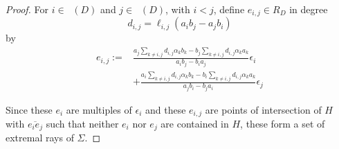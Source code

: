 \documentclass{amsart}
\theoremstyle{plain}
\theoremstyle{definition}
\theoremstyle{remark}
\newtheorem{rem}[thm]{Remark}
\numberwithin{equation}{section}
\newcommand\bida{a}
\newcommand\bidb{b}
\DeclareMathOperator{\Tp}{T_+}
\DeclareMathOperator{\Tm}{T_-}
\begin{document}
\begin{proof}
\noindent
For $i \in \Tp(D)$ and $j \in \Tm(D)$, with $i < j$, define $e_{i,j}\in R_D$ in degree 
\[
	d_{i,j} = \ell_{i, j}(\bida_i \bidb_j - \bida_j \bidb_i)
\]
by
\begin{align}\label{eqn:epsilon_i,j}
e_{i,j} := &\frac{a_j\sum_{k\ne i,j} d_{i,j}\alpha_k b_k - b_j\sum_{k \ne i,j} d_{i,j} \alpha_k a_k}{a_ib_j - b_i a_j} \epsilon_i \\
&+ \frac{a_i \sum_{k\ne i,j} d_{i,j} \alpha_k b_k - b_i\sum_{k\ne i,j} d_{i,j} \alpha_ka_k}{a_jb_i - b_j a_i} \epsilon_j
%	
\end{align}

%

Since these $e_i$ are multiples of $\epsilon_i$ and these
$e_{i,j}$ are points of intersection of $H$ with
$\overline {e_ie_j}$ such that neither $e_i$ nor $e_j$
are contained in $H$, these form a set of extremal rays of $\Sigma$.



\end{proof}
\end{document}
